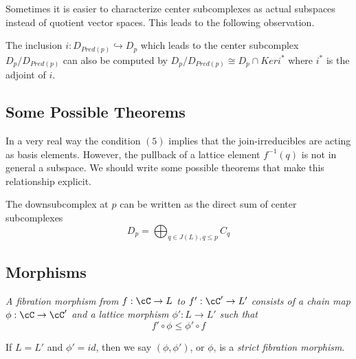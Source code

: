 Sometimes it is easier to characterize center subcomplexes as actual subspaces instead of quotient vector spaces.  This leads to the following observation.
\begin{prop}
The inclusion $i:D_{Pred(p)}\hookrightarrow D_p$ which leads to the center subcomplex $D_p/D_{Pred(p)}$ can also be computed by $D_p/D_{Pred(p)}\cong D_p \cap Keri^*$ where $i^*$ is the adjoint of $i$.
\end{prop}



%
%
%



\subsection{Some Possible Theorems}

In a very real way the condition $(5)$ implies that the join-irreducibles are acting as basis elements.  However, the pullback of a lattice element $f^{-1}(q)$ is not in general a subspace.  We should write some possible theorems that make this relationship explicit.




\begin{prop}
The downsubcomplex at $p$ can be written as the direct sum of center subcomplexes $$D_p = \bigoplus_{q\in J(L), q\leq p} C_q$$
\end{prop}



\subsection{Morphisms}
\begin{defn}
{\em
A {\em fibration morphism} from $f:\cC\to L$ to $f':\cC'\to L'$ consists of a chain map $\phi:\cC\to \cC'$ and a lattice morphism $\phi':L\to L'$ such that $$f'\circ \phi \leq \phi'\circ f$$

 If $L=L'$ and $\phi' = id$, then we say $(\phi,\phi')$, or $\phi$, is a {\em strict fibration morphism}.
}
\end{defn}

